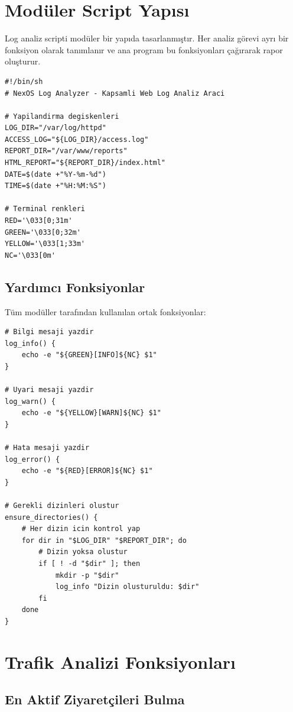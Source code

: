 \documentclass[12pt,a4paper]{report}
\begin{document}
\section{Modüler Script Yapısı}

Log analiz scripti modüler bir yapıda tasarlanmıştır. Her analiz görevi ayrı bir fonksiyon olarak tanımlanır ve ana program bu fonksiyonları çağırarak rapor oluşturur.

\begin{lstlisting}[style=bashstyle,caption={Script Konfigurasyon Bolumu}]
#!/bin/sh
# NexOS Log Analyzer - Kapsamli Web Log Analiz Araci

# Yapilandirma degiskenleri
LOG_DIR="/var/log/httpd"
ACCESS_LOG="${LOG_DIR}/access.log"
REPORT_DIR="/var/www/reports"
HTML_REPORT="${REPORT_DIR}/index.html"
DATE=$(date +"%Y-%m-%d")
TIME=$(date +"%H:%M:%S")

# Terminal renkleri
RED='\033[0;31m'
GREEN='\033[0;32m'
YELLOW='\033[1;33m'
NC='\033[0m'
\end{lstlisting}

\subsection{Yardımcı Fonksiyonlar}

Tüm modüller tarafından kullanılan ortak fonksiyonlar:

\begin{lstlisting}[style=bashstyle,caption={Yardimci Fonksiyonlar}]
# Bilgi mesaji yazdir
log_info() {
    echo -e "${GREEN}[INFO]${NC} $1"
}

# Uyari mesaji yazdir
log_warn() {
    echo -e "${YELLOW}[WARN]${NC} $1"
}

# Hata mesaji yazdir
log_error() {
    echo -e "${RED}[ERROR]${NC} $1"
}

# Gerekli dizinleri olustur
ensure_directories() {
    # Her dizin icin kontrol yap
    for dir in "$LOG_DIR" "$REPORT_DIR"; do
        # Dizin yoksa olustur
        if [ ! -d "$dir" ]; then
            mkdir -p "$dir"
            log_info "Dizin olusturuldu: $dir"
        fi
    done
}
\end{lstlisting}

\section{Trafik Analizi Fonksiyonları}

\subsection{En Aktif Ziyaretçileri Bulma}
\end{document}
